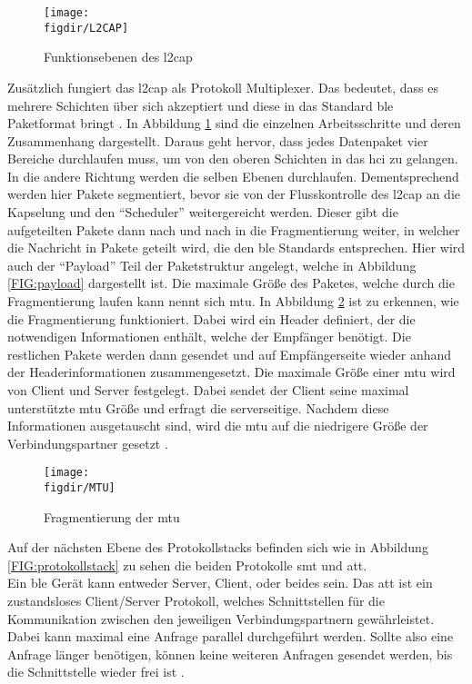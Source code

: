 \begin{figure}[h]
	\centering
	\texttt{[image: \\figdir/L2CAP]}
	\caption{Funktionsebenen des \ac{l2cap} \cite{TI:WWW}}
	\label{FIG:l2cap}
\end{figure}

\noindent Zusätzlich fungiert das \ac{l2cap} als Protokoll Multiplexer. Das bedeutet, dass es mehrere Schichten über sich akzeptiert und diese in das Standard \ac{ble} Paketformat bringt \cite[Seite 25]{Townsend14:GSB}. In Abbildung \ref{FIG:l2cap} sind die einzelnen Arbeitsschritte und deren Zusammenhang dargestellt. Daraus geht hervor, dass jedes Datenpaket vier Bereiche durchlaufen muss, um von den oberen Schichten in das \ac{hci} zu gelangen. In die andere Richtung werden die selben Ebenen durchlaufen. Dementsprechend werden hier Pakete segmentiert, bevor sie von der Flusskontrolle des \ac{l2cap} an die Kapselung und den "`Scheduler"' weitergereicht werden. Dieser gibt die aufgeteilten Pakete dann nach und nach in die Fragmentierung weiter, in welcher die Nachricht in Pakete geteilt wird, die den \ac{ble} Standards entsprechen. Hier wird auch der "`Payload"' Teil der Paketstruktur angelegt, welche in Abbildung \ref{FIG:payload} dargestellt ist. Die maximale Größe des Paketes, welche durch die Fragmentierung laufen kann nennt sich \ac{mtu}. In Abbildung \ref{FIG:mtu} ist zu erkennen, wie die Fragmentierung funktioniert. Dabei wird ein Header definiert, der die notwendigen Informationen enthält, welche der Empfänger benötigt. Die restlichen Pakete werden dann gesendet und auf Empfängerseite wieder anhand der Headerinformationen zusammengesetzt. Die maximale Größe einer \ac{mtu} wird von Client und Server festgelegt. Dabei sendet der Client seine maximal unterstützte \ac{mtu} Größe und erfragt die serverseitige. Nachdem diese Informationen ausgetauscht sind, wird die \ac{mtu} auf die niedrigere Größe der Verbindungspartner gesetzt \cite{TI:WWW}.\\ 

\begin{figure}[h]
	\centering
	\texttt{[image: \\figdir/MTU]}
	\caption{Fragmentierung der \ac{mtu} \cite{TI:WWW}}
	\label{FIG:mtu}
\end{figure}

\noindent Auf der nächsten Ebene des Protokollstacks befinden sich wie in Abbildung \ref{FIG:protokollstack} zu sehen die beiden Protokolle \ac{smt} und \ac{att}.\\

\noindent Ein \ac{ble} Gerät kann entweder Server, Client, oder beides sein. Das \ac{att} ist ein zustandsloses Client/Server Protokoll, welches Schnittstellen für die Kommunikation zwischen den jeweiligen Verbindungspartnern gewährleistet. Dabei kann maximal eine Anfrage parallel durchgeführt werden. Sollte also eine Anfrage länger benötigen, können keine weiteren Anfragen gesendet werden, bis die Schnittstelle wieder frei ist \cite[Seite 26]{Townsend14:GSB}.\\

